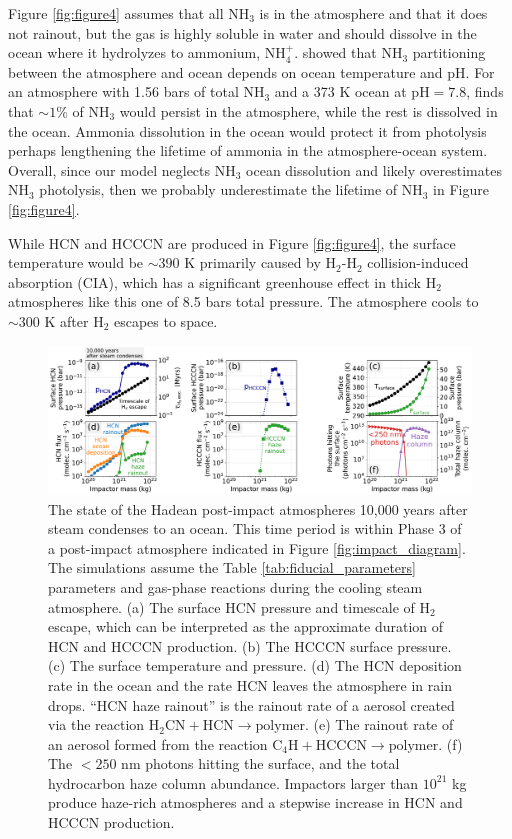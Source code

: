 Figure \ref{fig:figure4} assumes that all NH$_3$ is in the atmosphere and that it does not rainout, but the gas is highly soluble in water and should dissolve in the ocean where it hydrolyzes to ammonium, NH$_4^+$. \citet{Zahnle_2020} showed that NH$_3$ partitioning between the atmosphere and ocean depends on ocean temperature and pH. For an atmosphere with 1.56 bars of total NH$_3$ and a 373 K ocean at $\text{pH} = 7.8$, \citet{Zahnle_2020} finds that $\sim 1\%$ of NH$_3$ would persist in the atmosphere, while the rest is dissolved in the ocean. Ammonia dissolution in the ocean would protect it from photolysis perhaps lengthening the lifetime of ammonia in the atmosphere-ocean system. Overall, since our model neglects NH$_3$ ocean dissolution and likely overestimates NH$_3$ photolysis, then we probably underestimate the lifetime of NH$_3$ in Figure \ref{fig:figure4}.

While HCN and HCCCN are produced in Figure \ref{fig:figure4}, the surface temperature would be $\sim 390$ K primarily caused by H$_2$-H$_2$ collision-induced absorption (CIA), which has a significant greenhouse effect in thick H$_2$ atmospheres like this one of 8.5 bars total pressure. The atmosphere cools to $\sim 300$ K after H$_2$ escapes to space.

\begin{figure}
  \centering
  \includegraphics[width=1.0\textwidth]{tex/5impacts/figures/Figure5.pdf}
  \caption{The state of the Hadean post-impact atmospheres 10,000 years after steam condenses to an ocean. This time period is within Phase 3 of a post-impact atmosphere indicated in Figure \ref{fig:impact_diagram}. The simulations assume the Table \ref{tab:fiducial_parameters} parameters and gas-phase reactions during the cooling steam atmosphere. (a) The surface HCN pressure and timescale of H$_2$ escape, which can be interpreted as the approximate duration of HCN and HCCCN production. (b) The HCCCN surface pressure. (c) The surface temperature and pressure. (d) The HCN deposition rate in the ocean and the rate HCN leaves the atmosphere in rain drops. ``HCN haze rainout'' is the rainout rate of a aerosol created via the reaction $\mathrm{H_2CN} + \mathrm{HCN} \rightarrow \mathrm{polymer}$. (e) The rainout rate of an aerosol formed from the reaction $\mathrm{C_4H} + \mathrm{HCCCN} \rightarrow \mathrm{polymer}$. (f) The $< 250$ nm photons hitting the surface, and the total hydrocarbon haze column abundance. Impactors larger than $10^{21}$ kg produce haze-rich atmospheres and a stepwise increase in HCN and HCCCN production.}
  \label{fig:figure5}
\end{figure}

